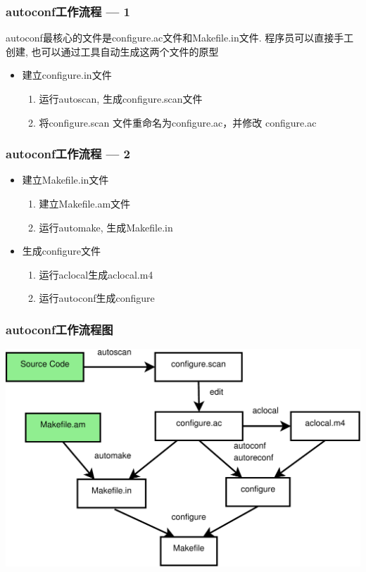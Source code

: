 \documentclass[compress]{beamer}
\begin{document}
\begin{frame}
  \frametitle{autoconf工作流程 --- 1}
  autoconf最核心的文件是configure.ac文件和Makefile.in文件. 
  程序员可以直接手工创建, 也可以通过工具自动生成这两个文件的原型
  \begin{itemize}
	\item 建立configure.in文件
	  \begin{enumerate}
		\item 运行\alert{autoscan}, 生成configure.scan文件
		\item 将configure.scan 文件重命名为configure.ac，并修改
            configure.ac
	  \end{enumerate}
  \end{itemize}
  
\end{frame}

\begin{frame}
  \frametitle{autoconf工作流程 --- 2}
  \begin{itemize}
	\item 建立Makefile.in文件
	  \begin{enumerate}
		\item 建立Makefile.am文件
		\item 运行\alert{automake}, 生成Makefile.in
	  \end{enumerate}
	\item 生成configure文件
	  \begin{enumerate}
		\item 运行\alert{aclocal}生成aclocal.m4
		\item 运行\alert{autoconf}生成configure
	  \end{enumerate}
  \end{itemize}
  
\end{frame}

\begin{frame}
  \frametitle{autoconf工作流程图}
  \centering\includegraphics[width=0.8\hsize]{auto.pdf}
  
\end{frame}
\end{document}
